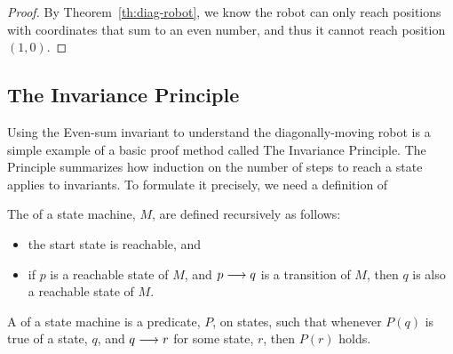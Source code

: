 \begin{proof}
By Theorem~\ref{th:diag-robot}, we know the robot can only reach
positions with coordinates that sum to an even number, and thus it
cannot reach position~$(1, 0)$.
\end{proof}

\iffalse
Since this was the first time we proved that a predicate was an
invariant, we were careful to go through all four cases in gory
detail.  As you become more experienced with such proofs, you will
likely become more brief as well.  Indeed, if we were going through
the proof again at a later point in the text, we might simply note
that the sum of the coordinates after step~$t + 1$ can be only $x +
y$, $x + y + 2$ or $x + y - 2$ and therefore that the sum is even.
\fi

\subsection{The Invariance Principle}
Using the Even-sum invariant to understand the diagonally-moving robot
is a simple example of a basic proof method called The Invariance
Principle.  The Principle summarizes how induction on the number of
steps to reach a state applies to invariants.  To formulate it
precisely, we need a definition of 

\begin{definition}
The  of a state machine, $M$, are defined
recursively as follows:
\begin{itemize}
\item the start state is reachable, and
\item if $p$ is a reachable state of $M$, and $p \mathrel{\longrightarrow} q$ is a
  transition of $M$, then $q$ is also a reachable state of $M$.
\end{itemize}
\end{definition}

\iffalse
A (possibly infinite) path through the state graph beginning at the
start state corresponds to a possible system behavior; such a path is
called an \term{execution} of the state machine.  A state is called
\term{reachable} if it appears in some execution.\fi

\begin{definition}
  A  of a state machine is a predicate, $P$, on
  states, such that whenever $P(q)$ is true of a state, $q$, and $q
  \mathrel{\longrightarrow} r$ for some state, $r$, then $P(r)$ holds.
\end{definition}

